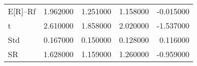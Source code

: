 \begin{tabular}{lrrrr}
\toprule
\midrule
E[R]--Rf & 1.962000 & 1.251000 & 1.158000 & -0.015000 \\
t & 2.610000 & 1.858000 & 2.020000 & -1.537000 \\
Std & 0.167000 & 0.150000 & 0.128000 & 0.116000 \\
SR & 1.628000 & 1.159000 & 1.260000 & -0.959000 \\
\bottomrule
\end{tabular}
